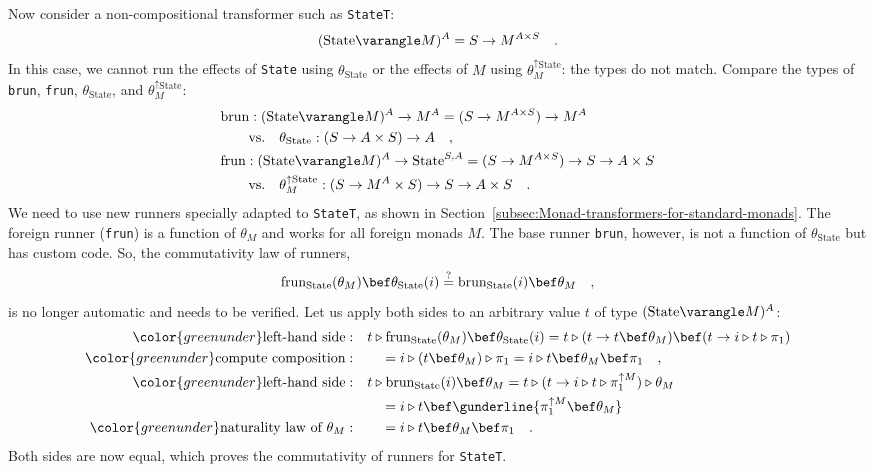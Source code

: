 Now consider a non-compositional transformer such as \lstinline!StateT!:
\[
(\text{State}\varangle M)^{A}=S\rightarrow M^{A\times S}\quad.
\]
In this case, we cannot run the effects of \lstinline!State! using
$\theta_{\text{State}}$ or the effects of $M$ using $\theta_{M}^{\uparrow\text{State}}$:
the types do not match. Compare the types of \lstinline!brun!, \lstinline!frun!,
$\theta_{\text{State}}$, and $\theta_{M}^{\uparrow\text{State}}$:
\begin{align*}
 & \text{brun}:(\text{State}\varangle M)^{A}\rightarrow M^{A}=(S\rightarrow M^{A\times S})\rightarrow M^{A}\\
 & \quad\quad\text{vs.}\quad\theta_{\text{State}}:\left(S\rightarrow A\times S\right)\rightarrow A\quad,\\
 & \text{frun}:(\text{State}\varangle M)^{A}\rightarrow\text{State}^{S,A}=(S\rightarrow M^{A\times S})\rightarrow S\rightarrow A\times S\\
 & \quad\quad\text{vs.}\quad\theta_{M}^{\uparrow\text{State}}:(S\rightarrow M^{A}\times S)\rightarrow S\rightarrow A\times S\quad.
\end{align*}
We need to use new runners specially adapted to \lstinline!StateT!,
as shown in Section~\ref{subsec:Monad-transformers-for-standard-monads}.
The foreign runner (\lstinline!frun!) is a function of $\theta_{M}$
and works for all foreign monads $M$. The base runner \lstinline!brun!,
however, is not a function of $\theta_{\text{State}}$ but has custom
code. So, the commutativity law of runners,
\[
\text{frun}_{\text{State}}(\theta_{M})\bef\theta_{\text{State}}(i)\overset{?}{=}\text{brun}_{\text{State}}(i)\bef\theta_{M}\quad,
\]
is no longer automatic and needs to be verified. Let us apply both
sides to an arbitrary value $t$ of type $(\text{State}\varangle M)^{A}$:
\begin{align*}
{\color{greenunder}\text{left-hand side}:}\quad & t\triangleright\text{frun}_{\text{State}}(\theta_{M})\bef\theta_{\text{State}}(i)=t\triangleright(t\rightarrow t\bef\theta_{M})\bef(t\rightarrow i\triangleright t\triangleright\pi_{1})\\
{\color{greenunder}\text{compute composition}:}\quad & \quad=i\triangleright(t\bef\theta_{M})\triangleright\pi_{1}=i\triangleright t\bef\theta_{M}\bef\pi_{1}\quad,\\
{\color{greenunder}\text{left-hand side}:}\quad & t\triangleright\text{brun}_{\text{State}}(i)\bef\theta_{M}=t\triangleright(t\rightarrow i\triangleright t\triangleright\pi_{1}^{\uparrow M})\triangleright\theta_{M}\\
 & \quad=i\triangleright t\bef\gunderline{\pi_{1}^{\uparrow M}\bef\theta_{M}}\\
{\color{greenunder}\text{naturality law of }\theta_{M}:}\quad & \quad=i\triangleright t\bef\theta_{M}\bef\pi_{1}\quad.
\end{align*}
Both sides are now equal, which proves the commutativity of runners
for \lstinline!StateT!.

